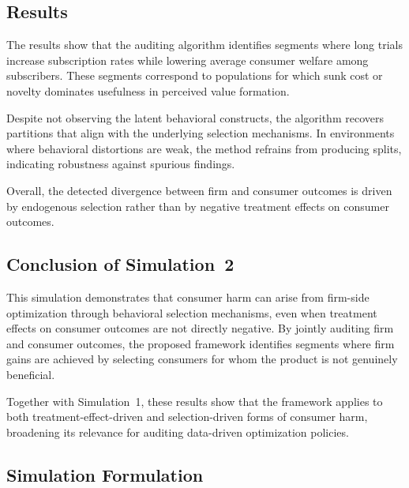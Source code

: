 \documentclass[11pt,letterpaper,english]{article}
\theoremstyle{definition}
\theoremstyle{definition}
\begin{document}
\begin{bibunit}
\subsection{Results}
\label{sec:simulation2-results}

The results show that the auditing algorithm identifies segments where long trials increase subscription rates while lowering average consumer welfare among subscribers. These segments correspond to populations for which sunk cost or novelty dominates usefulness in perceived value formation.

Despite not observing the latent behavioral constructs, the algorithm recovers partitions that align with the underlying selection mechanisms. In environments where behavioral distortions are weak, the method refrains from producing splits, indicating robustness against spurious findings.

Overall, the detected divergence between firm and consumer outcomes is driven by endogenous selection rather than by negative treatment effects on consumer outcomes.

\subsection{Conclusion of Simulation~2}

This simulation demonstrates that consumer harm can arise from firm-side optimization through behavioral selection mechanisms, even when treatment effects on consumer outcomes are not directly negative. By jointly auditing firm and consumer outcomes, the proposed framework identifies segments where firm gains are achieved by selecting consumers for whom the product is not genuinely beneficial.

Together with Simulation~1, these results show that the framework applies to both treatment-effect-driven and selection-driven forms of consumer harm, broadening its relevance for auditing data-driven optimization policies.
















\subsection{Simulation Formulation}
\label{sec:simulation2-formulation}


\end{bibunit}
\end{document}

